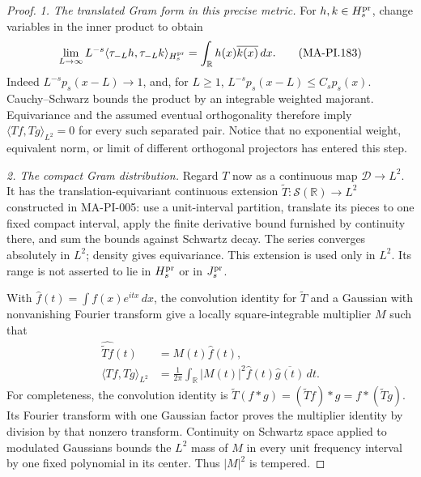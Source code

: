 \begin{proof}
\emph{1. The translated Gram form in this precise metric.}
For \(h,k\in H_s^{\rm pr}\), change variables in the inner
product to obtain
\[
 \lim_{L\to\infty}L^{-s}
       \langle\tau_{-L}h,\tau_{-L}k\rangle_{H_s^{\rm pr}}
                    =\int_{\mathbb R}h(x)\overline{k(x)}\,dx.
 \tag{MA-PI.183}
\]
Indeed \(L^{-s}p_s(x-L)\to1\), and, for \(L\ge1\),
\(L^{-s}p_s(x-L)\le C_s p_s(x)\).
Cauchy--Schwarz bounds the product by an integrable weighted
majorant. Equivariance and the assumed eventual orthogonality
therefore imply
\(\langle Tf,Tg\rangle_{L^2}=0\) for every such separated pair.
Notice that no exponential weight, equivalent norm, or limit
of different orthogonal projectors has entered this step.

\emph{2. The compact Gram distribution.}
Regard \(T\) now as a continuous map \(\mathcal D\to L^2\).
It has the translation-equivariant continuous extension
\(\widetilde T:\mathcal S(\mathbb R)\to L^2\) constructed in
MA-PI-005: use a unit-interval partition, translate its pieces
to one fixed compact interval, apply the finite derivative
bound furnished by continuity there, and sum the bounds
against Schwartz decay. The series converges absolutely in
\(L^2\); density gives equivariance. This extension is used
only in \(L^2\). Its range is not asserted to lie in
\(H_s^{\rm pr}\) or in \(J_s^{\rm pr}\).

With \(\widehat f(t)=\int f(x)e^{itx}\,dx\), the convolution
identity for \(\widetilde T\) and a Gaussian with nonvanishing
Fourier transform give a locally square-integrable multiplier
\(M\) such that
\[
 \begin{aligned}
 \widehat{\widetilde T f}(t)&=M(t)\widehat f(t),\\
 \langle Tf,Tg\rangle_{L^2}
    &=\frac1{2\pi}\int_{\mathbb R}|M(t)|^2
                        \widehat f(t)\overline{\widehat g(t)}\,dt.
 \end{aligned}
 \tag{MA-PI.184}
\]
For completeness, the convolution identity is
\(\widetilde T(f*g)=(\widetilde T f)*g=f*(\widetilde T g)\).
Its Fourier transform with one Gaussian factor proves the
multiplier identity by division by that nonzero transform.
Continuity on Schwartz space applied to modulated Gaussians
bounds the \(L^2\) mass of \(M\) in every unit frequency
interval by one fixed polynomial in its center.
Thus \(|M|^2\) is tempered.


\end{proof}
